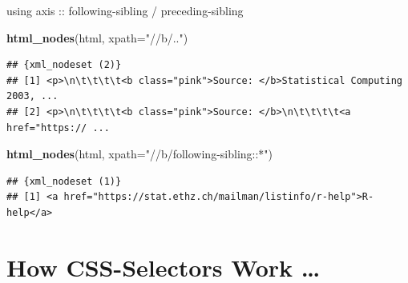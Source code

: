 \documentclass[ignorenonframetext,]{beamer}
\newenvironment{Shaded}{\begin{snugshade}}{\end{snugshade}}
\newcommand{\KeywordTok}[1]{\textcolor[rgb]{0.13,0.29,0.53}{\textbf{{#1}}}}
\newcommand{\DataTypeTok}[1]{\textcolor[rgb]{0.13,0.29,0.53}{{#1}}}
\newcommand{\StringTok}[1]{\textcolor[rgb]{0.31,0.60,0.02}{{#1}}}
\newcommand{\NormalTok}[1]{{#1}}
\begin{document}
\begin{frame}[fragile]{using axis :: following-sibling /
preceding-sibling}

\begin{Shaded}
\begin{Highlighting}[]
\KeywordTok{html_nodes}\NormalTok{(html, }\DataTypeTok{xpath=}\StringTok{"//b/.."}\NormalTok{)}
\end{Highlighting}
\end{Shaded}

\begin{verbatim}
## {xml_nodeset (2)}
## [1] <p>\n\t\t\t\t<b class="pink">Source: </b>Statistical Computing 2003, ...
## [2] <p>\n\t\t\t\t<b class="pink">Source: </b>\n\t\t\t\t<a href="https:// ...
\end{verbatim}

\begin{Shaded}
\begin{Highlighting}[]
\KeywordTok{html_nodes}\NormalTok{(html, }\DataTypeTok{xpath=}\StringTok{"//b/following-sibling::*"}\NormalTok{)}
\end{Highlighting}
\end{Shaded}

\begin{verbatim}
## {xml_nodeset (1)}
## [1] <a href="https://stat.ethz.ch/mailman/listinfo/r-help">R-help</a>
\end{verbatim}

\end{frame}

\section{How CSS-Selectors Work \ldots{}}\label{how-css-selectors-work}
\end{document}
